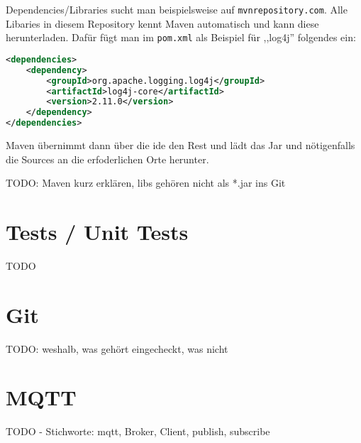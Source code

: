 Dependencies/Libraries sucht man beispielsweise auf \verb|mvnrepository.com|. Alle Libaries in diesem Repository kennt Maven automatisch und kann diese herunterladen. Dafür fügt man im \verb|pom.xml| als Beispiel für ,,log4j'' folgendes ein:
\begin{lstlisting}[language=XML]
<dependencies>
	<dependency>
		<groupId>org.apache.logging.log4j</groupId>
		<artifactId>log4j-core</artifactId>
		<version>2.11.0</version>
	</dependency>
</dependencies>
\end{lstlisting}
Maven übernimmt dann über die \acrshort{ide} den Rest und lädt das Jar und nötigenfalls die Sources an die erfoderlichen Orte herunter.

TODO: Maven kurz erklären, libs gehören nicht als *.jar ins Git
\section{Tests / Unit Tests}
TODO
\section{Git}
TODO: weshalb, was gehört eingecheckt, was nicht
\section{MQTT}
\label{sec:mqtt}
TODO - Stichworte: \acrshort{mqtt}, Broker, Client, publish, subscribe
